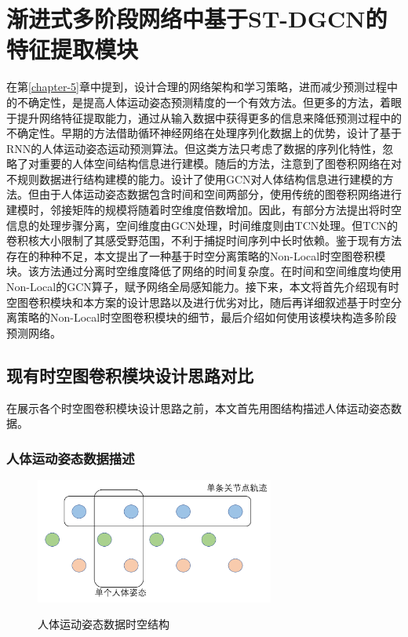 \chapter{渐进式多阶段网络中基于ST-DGCN的特征提取模块}\label{section:ST-DGCN}
在第\ref{chapter-5}章中提到，设计合理的网络架构和学习策略，进而减少预测过程中的不确定性，是提高人体运动姿态预测精度的一个有效方法。但更多的方法，着眼于提升网络特征提取能力，通过从输入数据中获得更多的信息来降低预测过程中的不确定性。早期的方法借助循环神经网络在处理序列化数据上的优势，设计了基于RNN的人体运动姿态运动预测算法。但这类方法只考虑了数据的序列化特性，忽略了对重要的人体空间结构信息进行建模。随后的方法，注意到了图卷积网络在对不规则数据进行结构建模的能力。设计了使用GCN对人体结构信息进行建模的方法。但由于人体运动姿态数据包含时间和空间两部分，使用传统的图卷积网络进行建模时，邻接矩阵的规模将随着时空维度倍数增加。因此，有部分方法提出将时空信息的处理步骤分离，空间维度由GCN处理，时间维度则由TCN\parencite{oord2016wavenet}处理。但TCN的卷积核大小限制了其感受野范围，不利于捕捉时间序列中长时依赖。鉴于现有方法存在的种种不足，本文提出了一种基于时空分离策略的Non-Local时空图卷积模块。该方法通过分离时空维度降低了网络的时间复杂度。在时间和空间维度均使用Non-Local的GCN算子，赋予网络全局感知能力。接下来，本文将首先介绍现有时空图卷积模块和本方案的设计思路以及进行优劣对比，随后再详细叙述基于时空分离策略的Non-Local时空图卷积模块的细节，最后介绍如何使用该模块构造多阶段预测网络。

\section{现有时空图卷积模块设计思路对比}
在展示各个时空图卷积模块设计思路之前，本文首先用图结构描述人体运动姿态数据。

\subsection{人体运动姿态数据描述}
\begin{figure}[ht]
    \centering
    \includegraphics[width=0.70\textwidth]{FigMa/human_pose_seq.png}\\
    \vspace{-0.3cm}
    \caption{人体运动姿态数据时空结构}
    \label{fig:human_pose_seq_structure}
\end{figure}

